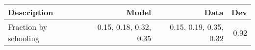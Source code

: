 \begin{tabular}{lrrr}
\hline
Description & Model  & Data  & Dev  \\ 
\hline
Fraction by schooling & 0.15, 0.18, 0.32, 0.35  & 0.15, 0.19, 0.35, 0.32  & 0.92  \\ 
\hline
\end{tabular}%
